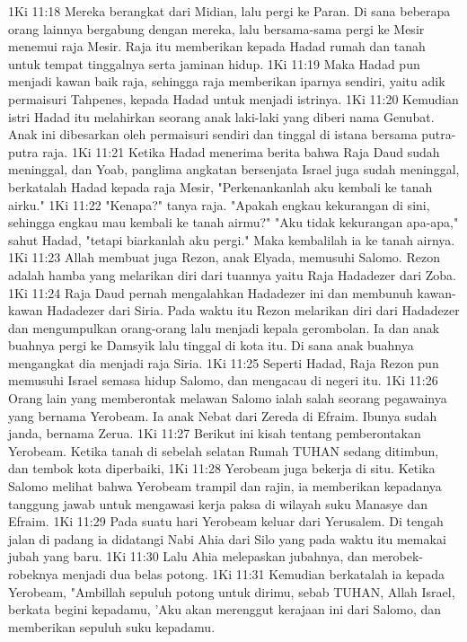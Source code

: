 1Ki 11:18  Mereka berangkat dari Midian, lalu pergi ke Paran. Di sana beberapa orang lainnya bergabung dengan mereka, lalu bersama-sama pergi ke Mesir menemui raja Mesir. Raja itu memberikan kepada Hadad rumah dan tanah untuk tempat tinggalnya serta jaminan hidup.
1Ki 11:19  Maka Hadad pun menjadi kawan baik raja, sehingga raja memberikan iparnya sendiri, yaitu adik permaisuri Tahpenes, kepada Hadad untuk menjadi istrinya.
1Ki 11:20  Kemudian istri Hadad itu melahirkan seorang anak laki-laki yang diberi nama Genubat. Anak ini dibesarkan oleh permaisuri sendiri dan tinggal di istana bersama putra-putra raja.
1Ki 11:21  Ketika Hadad menerima berita bahwa Raja Daud sudah meninggal, dan Yoab, panglima angkatan bersenjata Israel juga sudah meninggal, berkatalah Hadad kepada raja Mesir, "Perkenankanlah aku kembali ke tanah airku."
1Ki 11:22  "Kenapa?" tanya raja. "Apakah engkau kekurangan di sini, sehingga engkau mau kembali ke tanah airmu?" "Aku tidak kekurangan apa-apa," sahut Hadad, "tetapi biarkanlah aku pergi." Maka kembalilah ia ke tanah airnya.
1Ki 11:23  Allah membuat juga Rezon, anak Elyada, memusuhi Salomo. Rezon adalah hamba yang melarikan diri dari tuannya yaitu Raja Hadadezer dari Zoba.
1Ki 11:24  Raja Daud pernah mengalahkan Hadadezer ini dan membunuh kawan-kawan Hadadezer dari Siria. Pada waktu itu Rezon melarikan diri dari Hadadezer dan mengumpulkan orang-orang lalu menjadi kepala gerombolan. Ia dan anak buahnya pergi ke Damsyik lalu tinggal di kota itu. Di sana anak buahnya mengangkat dia menjadi raja Siria.
1Ki 11:25  Seperti Hadad, Raja Rezon pun memusuhi Israel semasa hidup Salomo, dan mengacau di negeri itu.
1Ki 11:26  Orang lain yang memberontak melawan Salomo ialah salah seorang pegawainya yang bernama Yerobeam. Ia anak Nebat dari Zereda di Efraim. Ibunya sudah janda, bernama Zerua.
1Ki 11:27  Berikut ini kisah tentang pemberontakan Yerobeam. Ketika tanah di sebelah selatan Rumah TUHAN sedang ditimbun, dan tembok kota diperbaiki,
1Ki 11:28  Yerobeam juga bekerja di situ. Ketika Salomo melihat bahwa Yerobeam trampil dan rajin, ia memberikan kepadanya tanggung jawab untuk mengawasi kerja paksa di wilayah suku Manasye dan Efraim.
1Ki 11:29  Pada suatu hari Yerobeam keluar dari Yerusalem. Di tengah jalan di padang ia didatangi Nabi Ahia dari Silo yang pada waktu itu memakai jubah yang baru.
1Ki 11:30  Lalu Ahia melepaskan jubahnya, dan merobek-robeknya menjadi dua belas potong.
1Ki 11:31  Kemudian berkatalah ia kepada Yerobeam, "Ambillah sepuluh potong untuk dirimu, sebab TUHAN, Allah Israel, berkata begini kepadamu, 'Aku akan merenggut kerajaan ini dari Salomo, dan memberikan sepuluh suku kepadamu.

